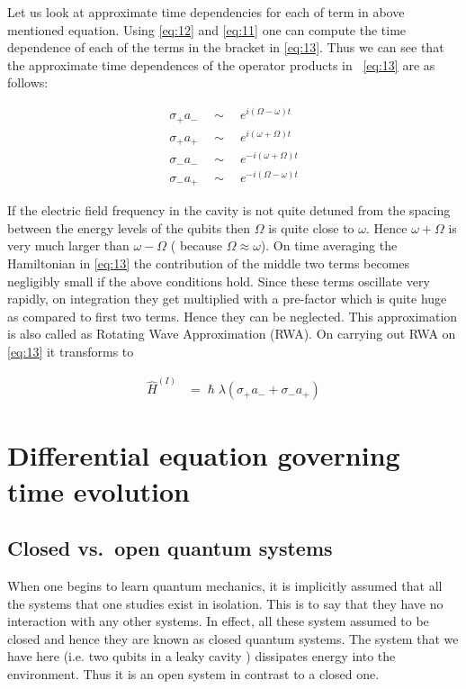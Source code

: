Let us look at approximate time dependencies for each of term in above mentioned equation. Using \eqref{eq:12} and \eqref{eq:11} one can compute the time dependence of each of the terms in the bracket in \eqref{eq:13}. Thus we can see that the approximate time dependences of the operator products
in ~\eqref{eq:13} are as follows:

\begin{align}\label{eq:14}
\sigma_{+}a_{-}\quad{\sim}\quad {e}^{i({\Omega}-{\omega})t}\\ 
\sigma_{+}a_{+}\quad{\sim}\quad {e}^{i({\omega}+{\Omega})t}\\
   \sigma_{-}a_{-}\quad{\sim}\quad {e}^{-i({\omega}+{\Omega})t}\\
\sigma_{-}a_{+}\quad{\sim}\quad {e}^{-i({\Omega}-{\omega})t} 
\end{align}

If the electric field frequency  in the cavity is not quite detuned  from the spacing between the energy levels of the qubits then ${\Omega}$  is quite close to ${\omega}$. Hence  ${\omega} +  {\Omega} $ is very much larger than ${\omega} -  {\Omega} $ ( because ${\Omega} \approx  {\omega} $). On time averaging the Hamiltonian in \eqref{eq:13} the contribution of the middle two terms  becomes negligibly small if the above conditions hold. Since these terms oscillate very rapidly, on integration  they get multiplied with a pre-factor which is quite huge as compared to first two terms.  Hence they can be neglected. This approximation is also called as Rotating Wave Approximation (RWA). On carrying out RWA on \eqref{eq:13} it transforms to 


\begin{center}
\begin{align}\label{eq:15}
\hat{H}^{(I)}&= \hslash\lambda(\sigma_{+} a_{-}  + \sigma_{-}a_{+} )
\end{align}
\end{center}


\section{Differential equation  governing time evolution}
\subsection{Closed vs.\ open quantum systems}
When one begins to learn quantum mechanics, it is implicitly assumed that all the systems that one studies exist in isolation. This is to say that they have no interaction with any other systems. In effect, all these system assumed to be closed and hence they are known as closed quantum systems. The system that we have here (i.e. two qubits in a leaky cavity ) dissipates energy into the environment. Thus it is an open system in contrast to  a closed one. %

